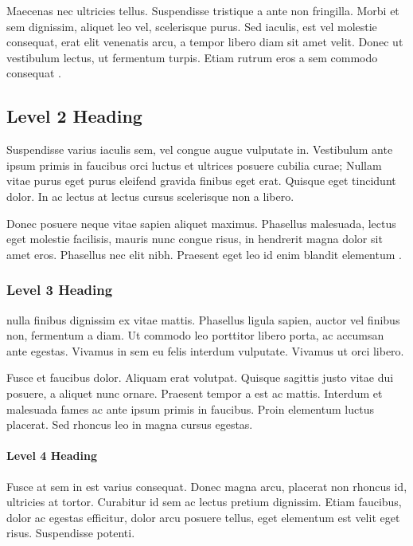 \documentclass[a4paper,12pt,stu,donotrepeattitle,floatsintext,twoside]{apa7}
\begin{document}

Maecenas nec ultricies tellus. Suspendisse tristique a ante non fringilla. Morbi et sem dignissim, aliquet leo vel, scelerisque purus. Sed iaculis, est vel molestie consequat, erat elit venenatis arcu, a tempor libero diam sit amet velit. Donec ut vestibulum lectus, ut fermentum turpis. Etiam rutrum eros a sem commodo consequat \parencite{Ludtkeetal2008}.

\subsection{Level 2 Heading}

Suspendisse varius iaculis sem, vel congue augue vulputate in. Vestibulum ante ipsum primis in faucibus orci luctus et ultrices posuere cubilia curae; Nullam vitae purus eget purus eleifend gravida finibus eget erat. Quisque eget tincidunt dolor. In ac lectus at lectus cursus scelerisque non a libero.

Donec posuere neque vitae sapien aliquet maximus. Phasellus malesuada, lectus eget molestie facilisis, mauris nunc congue risus, in hendrerit magna dolor sit amet eros. Phasellus nec elit nibh. Praesent eget leo id enim blandit elementum \parencite{Marshetal2009}.

\subsubsection{Level 3 Heading}

\textcite{Marshetal2009} nulla finibus dignissim ex vitae mattis. Phasellus ligula sapien, auctor vel finibus non, fermentum a diam. Ut commodo leo porttitor libero porta, ac accumsan ante egestas. Vivamus in sem eu felis interdum vulputate. Vivamus ut orci libero.

Fusce et faucibus dolor. Aliquam erat volutpat. Quisque sagittis justo vitae dui posuere, a aliquet nunc ornare. Praesent tempor a est ac mattis. Interdum et malesuada fames ac ante ipsum primis in faucibus. Proin elementum luctus placerat. Sed rhoncus leo in magna cursus egestas.

\paragraph{Level 4 Heading}

Fusce at sem in est varius consequat. Donec magna arcu, placerat non rhoncus id, ultricies at tortor. Curabitur id sem ac lectus pretium dignissim. Etiam faucibus, dolor ac egestas efficitur, dolor arcu posuere tellus, eget elementum est velit eget risus. Suspendisse potenti.
\end{document}
